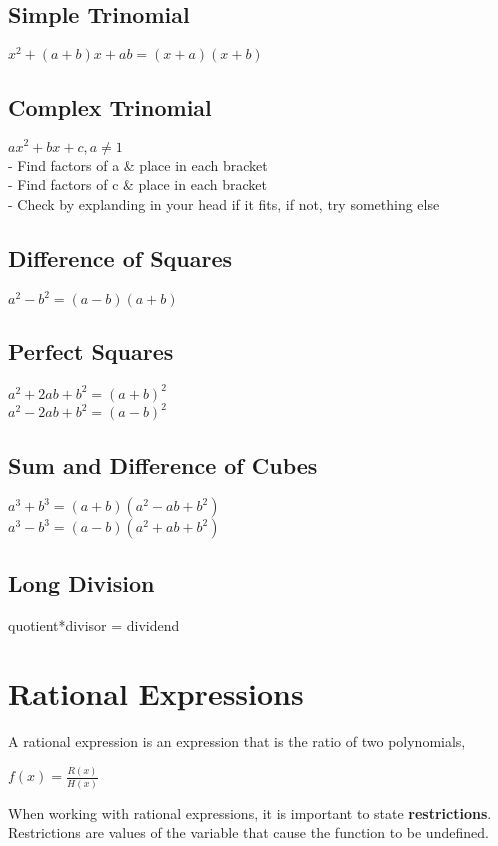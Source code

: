 \documentclass{article}
\begin{document}
\subsection*{Simple Trinomial}
$x^2+(a+b)x+ab = (x+a)(x+b)$

\subsection*{Complex Trinomial}
$ax^2+bx+c, a \neq 1$\\
- Find factors of a \& place in each bracket\\
- Find factors of c \& place in each bracket\\
- Check by explanding in your head if it fits, if not, try something else

\subsection*{Difference of Squares}
$a^2-b^2 = (a-b)(a+b)$

\subsection*{Perfect Squares}
$a^2+2ab+b^2 = (a+b)^2$\\
$a^2-2ab+b^2 = (a-b)^2$

\subsection*{Sum and Difference of Cubes}
$a^3+b^3 = (a+b)(a^2-ab+b^2)$\\
$a^3-b^3 = (a-b)(a^2+ab+b^2)$

\subsection*{Long Division}
quotient*divisor = dividend\\



\section{Rational Expressions}

A rational expression is an expression that is the ratio of two polynomials,\\
\begin{center}
$f(x) = \frac{R(x)}{H(x)}$
\end{center}
When working with rational expressions, it is important to state \textbf{restrictions}. Restrictions are values of the variable that cause the function to be undefined.\\\\
\end{document}
